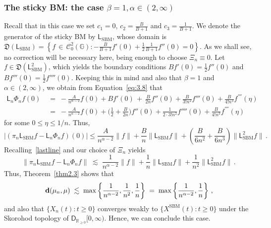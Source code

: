 \documentclass[12pt,a4paper]{article}
\theoremstyle{plain}
\theoremstyle{remark}
\newcommand{\msf}[1]{{\mathsf #1}}
\newcommand{\mc}[1]{{\mathcal #1}}
\newcommand{\mf}[1]{{\mathfrak #1}}
\newcommand{\bb}[1]{{\mathbb #1}}
\newcommand{\norm}[1]{\lVert#1\rVert}
\begin{document}
	\subsubsection{The sticky BM: the case  \texorpdfstring{$\beta = 1, \alpha \in (2, \infty)$}{beta = 1, alpha in (2, infty)}}
	Recall that in this case we set
	$c_1 = 0$, $c_2 = \frac{B}{B + 1}$ and  $c_3 = \frac{1}{B + 1}$.
	We denote the generator of the sticky BM by $\msf{L}_\text{SBM}$, whose  domain is
	$\mf{D}\left(\msf{L}_\text{SBM}\right)=\left\{f\,\in\,\mc{C}_0^2(\bb{G}):-\frac{B}{B + 1}f'(0)+\frac{1}{2}\frac{1}{B + 1}f''(0)=0\right\}$.
	As we shall see, no correction will be necessary here, being enough to choose $\Xi_n \equiv 0$.
	Let $f \in \mf{D}(\msf{L}^2_\text{SBM})$, which  yields the boundary conditions $Bf'(0) = \frac{1}{2}f''(0)$ and $Bf'''(0) = \frac{1}{2}f''''(0)$.
	Keeping this in mind and also that  $\beta = 1$ and $\alpha \in (2, \infty)$, we obtain from Equation~\eqref{eq:3.8} that
	\begin{align*}
		\msf{L}_n\Phi_nf(0)& \;=\;-\frac{A}{n^{\alpha - 2}}f(0)+Bf'(0)\,+\,\frac{B}{2n}f''(0)+\frac{B}{3!n^2}f'''(0)+\frac{B}{4!n^3}f^{''''}(\eta)\\
		&\;=\;-\frac{A}{n^{\alpha - 2}}f(0)+\Big(\frac{1}{2}+\frac{B}{2n}\Big)f''(0)+\frac{1}{2\cdot 3!n^2}f''''(0)+\frac{B}{4!n^3}f^{''''}(\eta)
	\end{align*}
	for some $0\leq \eta\leq 1/n$.
	Thus,
	\begin{equation*}\label{SBM1.1}
		|\left(\pi_n\msf{L}_\text{SBM}f - \msf{L}_n\Phi_nf\right)(0)| \leq \frac{A}{n^{\alpha - 2}}\norm{f} + \frac{B}{n}\norm{\msf{L}_\text{SBM}f} + \left(\frac{B}{6n^2} + \frac{B}{6n^3}\right)\norm{\msf{L}_\text{SBM}^2f}\,.
	\end{equation*}
	Recalling~\eqref{lastline} and our choice of $\Xi_n$ yields
	\begin{equation}\label{SBM1}
		\norm{\pi_n\msf{L}_{\text{SBM}}f - \msf{L}_n\Phi_nf} \;\lesssim\; \frac{1}{n^{\alpha - 2}}\norm{f} + \frac{1}{n}\norm{\msf{L}_\text{SBM}f} + \frac{1}{n^2}\norm{\msf{L}_\text{SBM}^2f}\,.
	\end{equation}
	Thus, Theorem~\ref{thm2.3} shows that
	\begin{equation*}
		{\bf d}(\mu_n,\mu)\;\lesssim\;\max\left\{\frac{1}{n^{\alpha - 2}}, \frac{1}{n^2}, \frac{1}{n}\right\}\;=\; \max\left\{\frac{1}{n^{\alpha - 2}}, \frac{1}{n}\right\}\,,
	\end{equation*}
	and also that $\{X_{n}(t): t\geq 0\}$ converges weakly to $\{X^\text{SBM}(t): t \geq 0\}$ under the Skorohod topology of $\msf{D}_{\bb{R}_{\geq 0}}[0,\infty)$. Hence, we can conclude this case.
	
\end{document}
